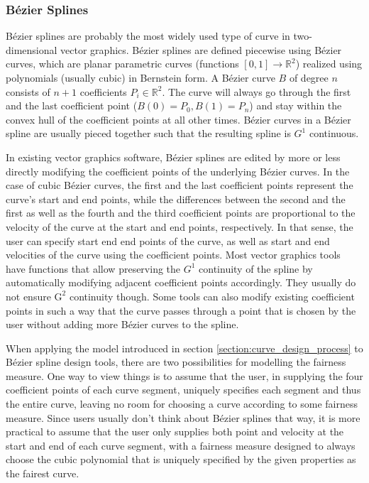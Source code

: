 \documentclass[a4paper]{article}
\newcommand{\apply}[2]{#1\!\left(#2\right)}
\begin{document}
			\subsubsection{Bézier Splines}
			\label{section:bézier_splines}

				Bézier splines are probably the most widely used type of curve in two-dimensional vector graphics. Bézier splines are defined piecewise using Bézier curves, which are planar parametric curves (functions \(\left[0,1\right] \rightarrow \mathbb{R}^2\)) realized using polynomials (usually cubic) in Bernstein form. A Bézier curve \(B\) of degree \(n\) consists of \(n + 1\) coefficients \(P_i \in \mathbb{R}^2\). The curve will always go through the first and the last coefficient point (\(\apply{B}{0} = P_0, \apply{B}{1} = P_n\)) and stay within the convex hull of the coefficient points at all other times. Bézier curves in a Bézier spline are usually pieced together such that the resulting spline is \(G^1\) continuous.

				In existing vector graphics software, Bézier splines are edited by more or less directly modifying the coefficient points of the underlying Bézier curves. In the case of cubic Bézier curves, the first and the last coefficient points represent the curve's start and end points, while the differences between the second and the first as well as the fourth and the third coefficient points are proportional to the velocity of the curve at the start and end points, respectively. In that sense, the user can specify start end end points of the curve, as well as start and end velocities of the curve using the coefficient points. Most vector graphics tools have functions that allow preserving the \(G^1\) continuity of the spline by automatically modifying adjacent coefficient points accordingly. They usually do not ensure \(\mathrm{G}^2\) continuity though. Some tools can also modify existing coefficient points in such a way that the curve passes through a point that is chosen by the user without adding more Bézier curves to the spline.

				When applying the model introduced in section \ref{section:curve_design_process} to Bézier spline design tools, there are two possibilities for modelling the fairness measure. One way to view things is to assume that the user, in supplying the four coefficient points of each curve segment, uniquely specifies each segment and thus the entire curve, leaving no room for choosing a curve according to some fairness measure. Since users usually don't think about Bézier splines that way, it is more practical to assume that the user only supplies both point and velocity at the start and end of each curve segment, with a fairness measure designed to always choose the cubic polynomial that is uniquely specified by the given properties as the fairest curve.
\end{document}
